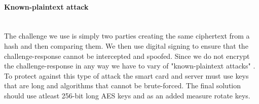 \paragraph{Known-plaintext attack}\mbox{}\\
The challenge we use is simply two parties creating the same ciphertext from a hash and then comparing them. We then use digital signing to ensure that the challenge-response cannot be intercepted and spoofed. Since we do not encrypt the challenge-response in any way we have to vary of "known-plaintext attacks" \cite{knownplaintextattack}. To protect against this type of attack the smart card and server must use keys that are long and algorithms that cannot be brute-forced. The final solution should use atleast 256-bit long AES keys and as an added measure rotate keys.
